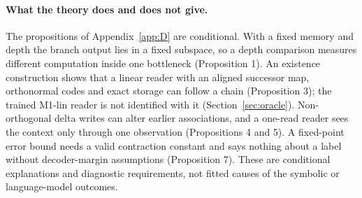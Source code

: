 \paragraph{What the theory does and does not give.}
The propositions of Appendix~\ref{app:D} are conditional.
With a fixed memory and depth the branch output lies in a fixed subspace, so a depth comparison measures different computation inside one bottleneck (Proposition 1).
An existence construction shows that a linear reader with an aligned successor map, orthonormal codes and exact storage can follow a chain (Proposition 3); the trained M1-lin reader is not identified with it (Section~\ref{sec:oracle}).
Non-orthogonal delta writes can alter earlier associations, and a one-read reader sees the context only through one observation (Propositions 4 and 5).
A fixed-point error bound needs a valid contraction constant and says nothing about a label without decoder-margin assumptions (Proposition 7).
These are conditional explanations and diagnostic requirements, not fitted causes of the symbolic or language-model outcomes.
